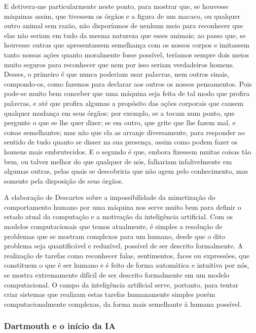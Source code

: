 \documentclass[12pt, a4paper]{article}
\begin{document}
\begin{displayquote}
E detivera-me particularmente neste ponto, para mostrar que, se houvesse máquinas assim, que tivessem os órgãos e a figura de um macaco,
ou qualquer outro animal sem razão, não disporíamos de nenhum meio para reconhecer que elas não seriam em tudo da mesma natureza que esses animais;
ao passo que, se houvesse outras que apresentassem semelhança com os nossos corpos e imitassem tanto nossas ações quanto moralmente fosse possível,
teríamos sempre dois meios muito seguros para reconhecer que nem por isso seriam verdadeiros homens. Desses, o primeiro é que nunca poderiam usar palavras,
nem outros sinais, compondo-os, como fazemos para declarar aos outros os nossos pensamentos. Pois pode-se muito bem conceber que uma máquina seja feita de tal modo que profira palavras, e até que profira algumas a propósito das ações corporais que causem qualquer mudança em seus órgãos: por exemplo,
se a tocam num ponto, que pergunte o que se lhe quer dizer; se em outro, que grite que lhe fazem mal, e coisas semelhantes;
mas não que ela as arranje diversamente, para responder ao sentido de tudo quanto se disser na sua presença, assim como podem fazer os homens mais embrutecidos. E o segundo é que, embora fizessem muitas coisas tão bem, ou talvez melhor do que qualquer de nós, falhariam infalivelmente em algumas outras,
pelas quais se descobriria que não agem pelo conhecimento, mas somente pela disposição de seus órgãos. \cite{descartes}
\end{displayquote}

A elaboração de Descartes sobre a impossibilidade da mimetização do comportamento humano por uma máquina nos serve muito bem para definir o estado atual da computação e a motivação da inteligência artificial.
Com os modelos computacionais que temos atualmente, 
é simples a resolução de problemas que se mostram complexos para um humano, 
desde que o dito problema seja quantificável e reduzível, possível de ser descrito formalmente.
A realização de tarefas como reconhecer falas, sentimentos, faces ou expressões, que constituem o que é ser humano e é feito de forma
automática e intuitiva por nós, se mostra extremamente difícil de ser descrito formalmente em um modelo computacional.
O campo da inteligência artificial serve, portanto, para tentar criar sistemas que realizam estas tarefas humanamente simples porém 
computacionalmente complexas, da forma mais semelhante à humana possível.

\subsubsection{Dartmouth e o início da IA}
\end{document}
